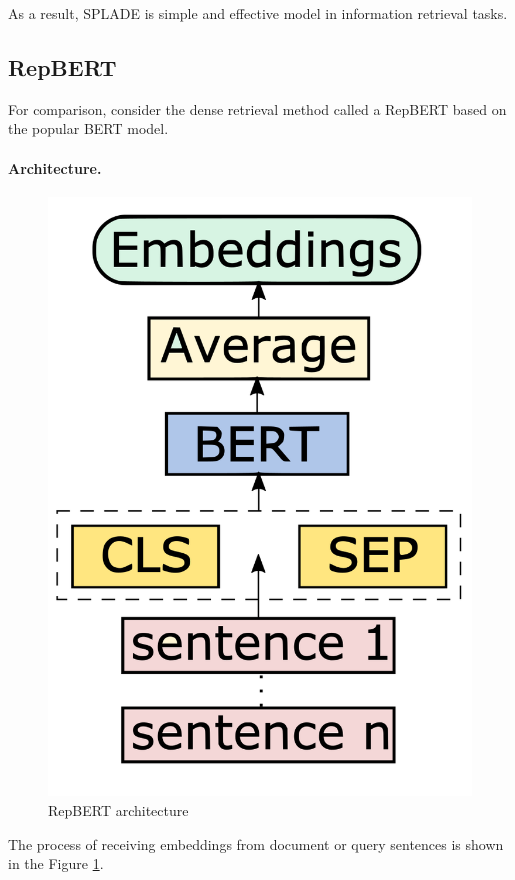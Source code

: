 \documentclass[
    twocolumn,
]{ceurart}
\begin{document}
    As a result, SPLADE is simple and effective model in information retrieval tasks.

    \subsection{RepBERT}

    For comparison, consider the dense retrieval method called a RepBERT based
    on the popular BERT model.

    \paragraph{Architecture.}
    \begin{figure}[h]
        \centering
        \includegraphics[scale=0.2]{RepBERT.png}
        \caption{RepBERT architecture}
        \label{fig:RepBERT}
    \end{figure}
    The process of receiving embeddings from document or query sentences is shown
    in the Figure \ref{fig:RepBERT}.
\end{document}

